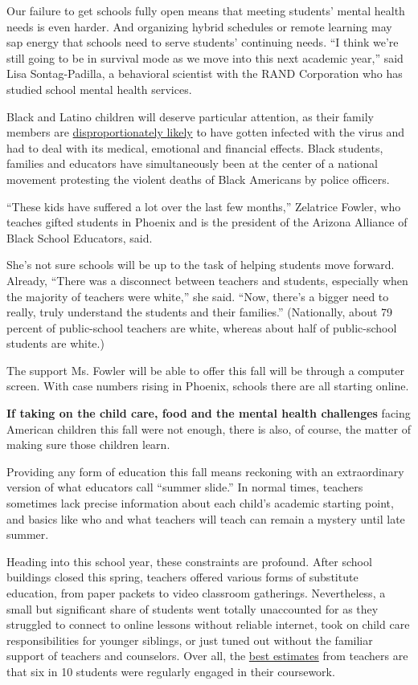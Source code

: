 Our failure to get schools fully open means that meeting students'
mental health needs is even harder. And organizing hybrid schedules or
remote learning may sap energy that schools need to serve students'
continuing needs. ``I think we're still going to be in survival mode as
we move into this next academic year,'' said Lisa Sontag-Padilla, a
behavioral scientist with the RAND Corporation who has studied school
mental health services.

Black and Latino children will deserve particular attention, as their
family members are
\href{https://www.nytimes3xbfgragh.onion/interactive/2020/07/05/us/coronavirus-latinos-african-americans-cdc-data.html}{disproportionately
likely} to have gotten infected with the virus and had to deal with its
medical, emotional and financial effects. Black students, families and
educators have simultaneously been at the center of a national movement
protesting the violent deaths of Black Americans by police officers.

``These kids have suffered a lot over the last few months,'' Zelatrice
Fowler, who teaches gifted students in Phoenix and is the president of
the Arizona Alliance of Black School Educators, said.

She's not sure schools will be up to the task of helping students move
forward. Already, ``There was a disconnect between teachers and
students, especially when the majority of teachers were white,'' she
said. ``Now, there's a bigger need to really, truly understand the
students and their families.'' (Nationally, about 79 percent of
public-school teachers are white, whereas about half of public-school
students are white.)

The support Ms. Fowler will be able to offer this fall will be through a
computer screen. With case numbers rising in Phoenix, schools there are
all starting online.

\textbf{If taking on the child care, food and the mental health
challenges} facing American children this fall were not enough, there is
also, of course, the matter of making sure those children learn.

Providing any form of education this fall means reckoning with an
extraordinary version of what educators call ``summer slide.'' In normal
times, teachers sometimes lack precise information about each child's
academic starting point, and basics like who and what teachers will
teach can remain a mystery until late summer.

Heading into this school year, these constraints are profound. After
school buildings closed this spring, teachers offered various forms of
substitute education, from paper packets to video classroom gatherings.
Nevertheless, a small but significant share of students went totally
unaccounted for as they struggled to connect to online lessons without
reliable internet, took on child care responsibilities for younger
siblings, or just tuned out without the familiar support of teachers and
counselors. Over all, the
\href{https://www.chalkbeat.org/2020/6/26/21304405/surveys-remote-learning-coronavirus-success-failure-teachers-parents}{best
estimates} from teachers are that six in 10 students were regularly
engaged in their coursework.

